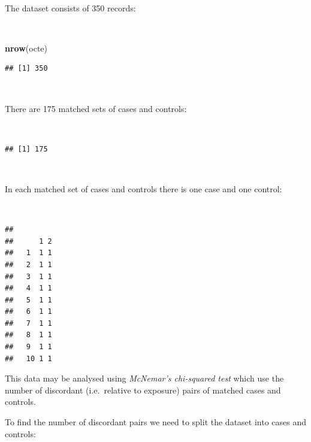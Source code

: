 \documentclass[12pt,a4paper]{book}
\newenvironment{Shaded}{\begin{snugshade}}{\end{snugshade}}
\newcommand{\KeywordTok}[1]{\textcolor[rgb]{0.13,0.29,0.53}{\textbf{#1}}}
\newcommand{\NormalTok}[1]{#1}
\newcommand{\OperatorTok}[1]{\textcolor[rgb]{0.81,0.36,0.00}{\textbf{#1}}}
\theoremstyle{definition}
\theoremstyle{definition}
\theoremstyle{definition}
\theoremstyle{remark}
\begin{document}
~

The dataset consists of 350 records:

~

\begin{Shaded}
\begin{Highlighting}[]
\KeywordTok{nrow}\NormalTok{(octe)}
\end{Highlighting}
\end{Shaded}

\begin{verbatim}
## [1] 350
\end{verbatim}

~

There are 175 matched sets of cases and controls:

~

\begin{Shaded}
\end{Shaded}

\begin{verbatim}
## [1] 175
\end{verbatim}

~

In each matched set of cases and controls there is one case and one
control:

~

\begin{Shaded}
\end{Shaded}

\begin{verbatim}
##     
##      1 2
##   1  1 1
##   2  1 1
##   3  1 1
##   4  1 1
##   5  1 1
##   6  1 1
##   7  1 1
##   8  1 1
##   9  1 1
##   10 1 1
\end{verbatim}

\newpage

This data may be analysed using \emph{McNemar's chi-squared test} which
use the number of discordant (i.e.~relative to exposure) pairs of
matched cases and controls.

To find the number of discordant pairs we need to split the dataset into
cases and controls:
\end{document}
